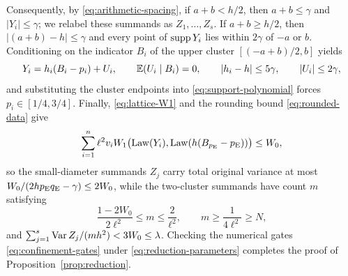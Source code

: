 Consequently, by \eqref{eq:arithmetic-spacing}, if $a+b<h/2$, then
$a+b\le\gamma$ and $|Y_i|\le\gamma$; we relabel these summands as
$Z_1,\ldots,Z_s$. If $a+b\ge h/2$, then $|(a+b)-h|\le\gamma$ and every point
of $\operatorname{supp} Y_i$ lies within $2\gamma$ of $-a$ or $b$. Conditioning on the
indicator $B_i$ of the upper cluster $[(-a+b)/2,b]$ yields
\begin{equation}\label{eq:cluster-representation}
 Y_i=h_i(B_i-p_i)+U_i,\qquad\mathbb E(U_i\mid B_i)=0,\qquad
 |h_i-h|\le5\gamma,\qquad |U_i|\le2\gamma,
\end{equation}
and substituting the cluster endpoints into \eqref{eq:support-polynomial}
forces $p_i\in[1/4,3/4]$. Finally, \eqref{eq:lattice-W1} and the rounding
bound \eqref{eq:rounded-data} give
\begin{equation}\label{eq:original-W1}
 \sum_{i=1}^n\ell^2v_i W_1\bigl(\operatorname{Law}(Y_i),\operatorname{Law}(h(B_{p_{\mathrm E}}-p_{\mathrm E}))\bigr)\le W_0,
\end{equation}
so the small-diameter summands $Z_j$ carry total original variance at most
$W_0/(2hp_{\mathrm E}q_{\mathrm E}-\gamma)\le2W_0$, while the two-cluster summands have count $m$
satisfying
\begin{equation}\label{eq:core-count}
 \frac{1-2W_0}{2\ell^2}\le m\le\frac2{\ell^2},
                         \qquad m\ge\frac1{4\ell^2}\ge N,
\end{equation}
and $\sum_{j=1}^s\operatorname{Var} Z_j/(mh^2)<3W_0\le\lambda$. Checking the numerical
gates \eqref{eq:confinement-gates} under \eqref{eq:reduction-parameters}
completes the proof of Proposition~\ref{prop:reduction}.
